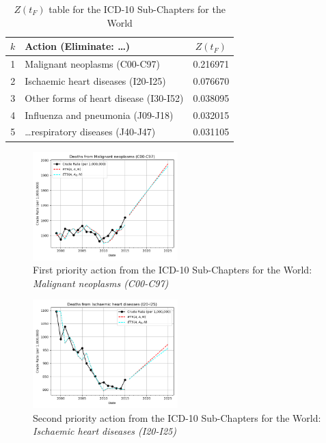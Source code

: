 \documentclass[10pt, a4paper, twocolumn]{IEEEconf}
\begin{document}
\begin{table}[H]
  \centering
  \begin{tabular}{clc}
    \toprule
      $k$ & Action (Eliminate: \ldots) & $Z(t_F)$ \\
    \midrule
      1 &                Malignant neoplasms (C00-C97) & 0.216971 \\
      2 &           Ischaemic heart diseases (I20-I25) & 0.076670 \\
      3 &       Other forms of heart disease (I30-I52) & 0.038095 \\
      4 &            Influenza and pneumonia (J09-J18) & 0.032015 \\
      5 &        \ldots respiratory diseases (J40-J47) & 0.031105 \\
    \bottomrule
  \end{tabular}
  \caption{$Z(t_F)$ table for the ICD-10 Sub-Chapters for the World}
  \label{table:ztable11}
\end{table}

\begin{figure}[H]
  \centering
  \includegraphics[width=0.5\textwidth]{results/WORLD_ICD10_SUB_CHAPTERS/Malignant_neoplasms_C00-C97_ets.png}
  \caption{First priority action from the ICD-10 Sub-Chapters for the World: \textit{Malignant neoplasms (C00-C97)}}\label{fig:k11a}
\end{figure}

\begin{figure}[H]
  \centering
  \includegraphics[width=0.5\textwidth]{results/WORLD_ICD10_SUB_CHAPTERS/Ischaemic_heart_diseases_I20-I25_ets.png}
  \caption{Second priority action from the ICD-10 Sub-Chapters for the World: \textit{Ischaemic heart diseases (I20-I25)}}\label{fig:k11b}
\end{figure}
\end{document}

